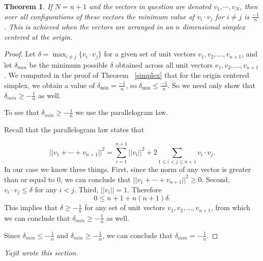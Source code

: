 \documentclass[11pt,letterpaper,twoside,english]{article}
\theoremstyle{theorem}
\newtheorem{theorem}{Theorem}[section]
\theoremstyle{remark}
\begin{document}
\begin{theorem}
If $N=n+1$ and the vectors in question are denoted $v_1,\cdots, v_N$, then over all configurations of these vectors the minimum value of $v_i\cdot v_j$ for $i\neq j$ is $\frac{-1}{n}$. This is achieved when the vectors are arranged in an $n$ dimensional simplex centered at the origin.  
\end{theorem}

\begin{proof}
Let $\delta= \max_{i\neq j}\{v_i\cdot v_j\}$ for a given set of unit vectors $v_1, v_2, \ldots, v_{n+1}$, and let $\delta_{min}$ be the minimum possible $\delta$ obtained across all unit vectors $v_1, v_2, \ldots, v_{n+1}$. We computed in the proof of Theorem ~\ref{simplex} that for the origin centered simplex, we obtain a value of $\delta_{\min}=\frac{-1}{n}$, so $\delta_{\min}\le\frac{-1}{n}$. So we need only show that $\delta_{min} \geq -\frac{1}{n}$ as well. 


To see that $\delta_{min} \ge-\frac{1}{n}$ we use the parallelogram law.

Recall that the parallelogram law states that 

$$
||v_1+\cdots+v_{n+1}||^2=\displaystyle\sum_{i=1}^{n+1}||v_i||^2+2\displaystyle\sum_{1\le i<j\le n+1}v_i\cdot v_j.
$$
In our case we know three things. First, since the norm of any vector is greater than or equal to $0$, we can conclude that $||v_1 + \cdots + v_{n+1}||^2 \geq 0$. Second, $v_i\cdot v_j\le\delta$ for any $i<j$. Third, $||v_i||=1$. Therefore 
$$
0\le n+1+n(n+1)\delta.
$$
This implies that $\delta\ge -\frac{1}{n}$ for any set of unit vectors $v_1, v_2, \ldots, v_{n+1}$, from which we can conclude that $\delta_{min} \ge -\frac{1}{n}$ as well.

Since $\delta_{min} \le -\frac{1}{n}$ and $\delta_{min} \ge -\frac{1}{n}$, we can conclude that $\delta_{min}=-\frac{1}{n}$.
\end{proof}

{\itshape Yajit wrote this section.}
\end{document}
